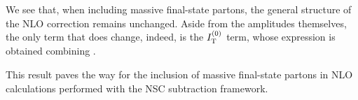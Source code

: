 We see that, when including massive final-state partons, the general structure of the NLO correction  remains unchanged. Aside from the amplitudes themselves, the only term that does change, indeed, is the $ I_\text{T}^{(0)} $ term, whose expression is obtained combining .

This result paves the way for the inclusion of massive final-state partons in NLO calculations performed with the NSC subtraction framework.










